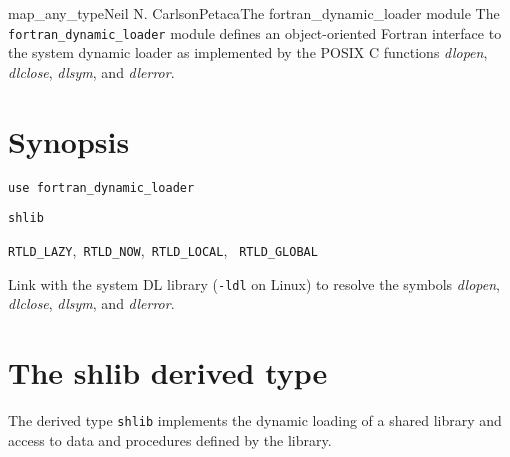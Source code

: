 \documentclass[11pt]{article}
\begin{document}

\begin{Name}{3}{map_any_type}{Neil N. Carlson}{Petaca}{The fortran_dynamic_loader module}
The \texttt{fortran_dynamic_loader} module defines an object-oriented Fortran
interface to the system dynamic loader as implemented by the POSIX C functions
\emph{dlopen}, \emph{dlclose}, \emph{dlsym}, and \emph{dlerror}.
\end{Name}

\section{Synopsis}
\begin{description}[style=nextline]\raggedright
\item[Usage]
  \verb+use fortran_dynamic_loader+
\item[Derived Type]
  \texttt{shlib}
\item[Parameters]
  \texttt{RTLD_LAZY},\texttt{ RTLD_NOW},\texttt{ RTLD_LOCAL},%
  \texttt{ RTLD_GLOBAL}
\item[Linking]
  Link with the system DL library (\texttt{-ldl} on Linux) to
  resolve the symbols \emph{dlopen}, \emph{dlclose}, \emph{dlsym}, and
  \emph{dlerror}.
\end{description}

\section{The shlib derived type}
The derived type \texttt{shlib} implements the dynamic loading of a shared
library and access to data and procedures defined by the library.
\end{document}
